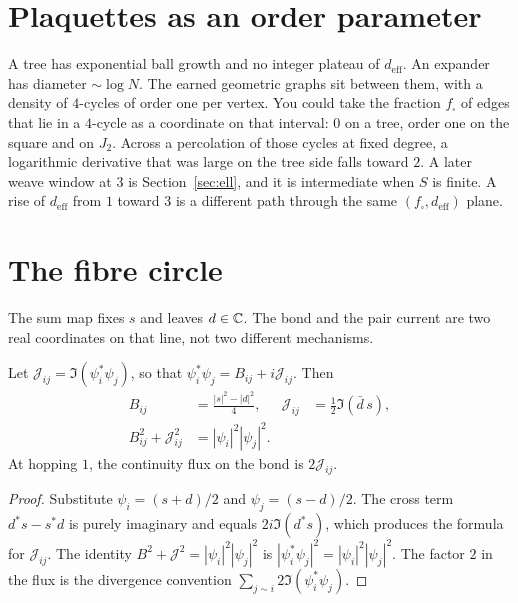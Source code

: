 \section{Plaquettes as an order parameter}
\label{sec:soup}

A tree has exponential ball growth and no integer plateau of
\(d_{\mathrm{eff}}\).
An expander has diameter \(\sim\log N\).
The earned geometric graphs sit between them, with a density of \(4\)-cycles
of order one per vertex.
You could take the fraction \(f_\square\) of edges that lie in a \(4\)-cycle
as a coordinate on that interval:
\(0\) on a tree, order one on the square and on \(J_2\).
Across a percolation of those cycles at fixed degree, a logarithmic
derivative that was large on the tree side falls toward \(2\).
A later weave window at \(3\) is Section~\ref{sec:ell}, and it is
intermediate when \(S\) is finite.
A rise of \(d_{\mathrm{eff}}\) from \(1\) toward \(3\) is a different path
through the same \((f_\square,d_{\mathrm{eff}})\) plane.

\section{The fibre circle}
\label{sec:circle}

The sum map fixes \(s\) and leaves \(d\in\mathbb{C}\).
The bond and the pair current are two real coordinates on that line,
not two different mechanisms.

\begin{lemma}
\label{lem:BJ}
Let \(\mathcal{J}_{ij}=\Im(\psi_i^*\psi_j)\), so that
\(\psi_i^*\psi_j=B_{ij}+i\mathcal{J}_{ij}\).
Then
\begin{align*}
B_{ij}&=\frac{|s|^2-|d|^2}{4},&
\mathcal{J}_{ij}&=\frac12\Im(\bar d\, s),\\
B_{ij}^2+\mathcal{J}_{ij}^2&=|\psi_i|^2|\psi_j|^2.
\end{align*}
At hopping \(1\), the continuity flux on the bond is \(2\mathcal{J}_{ij}\).
\end{lemma}

\begin{proof}
Substitute \(\psi_i=(s+d)/2\) and \(\psi_j=(s-d)/2\).
The cross term \(d^*s-s^*d\) is purely imaginary and equals
\(2i\Im(d^*s)\), which produces the formula for \(\mathcal{J}_{ij}\).
The identity \(B^2+\mathcal{J}^2=|\psi_i|^2|\psi_j|^2\) is
\(|\psi_i^*\psi_j|^2=|\psi_i|^2|\psi_j|^2\).
The factor \(2\) in the flux is the divergence convention
\(\sum_{j\sim i}2\Im(\psi_i^*\psi_j)\).
\end{proof}


